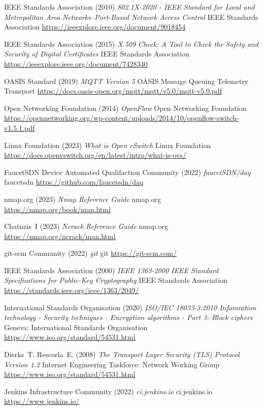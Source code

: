\documentclass[11pt, oneside]{book}   	%
\begin{document}
\begin{thebibliography}{99}
 IEEE Standards Association (2010)
\emph{802.1X-2020 - IEEE Standard for Local and Metropolitan Area Networks--Port-Based Network Access Control}
IEEE Standards Association
\url{https://ieeexplore.ieee.org/document/9018454}

 IEEE Standards Association (2015)
\emph{X.509 Check: A Tool to Check the Safety and Security of Digital Certificates}
IEEE Standards Association
\url{https://ieeexplore.ieee.org/document/7428340}

 OASIS Standard (2019)
\emph{MQTT Version 5}
OASIS Message Queuing Telemetry Transport 
\url{https://docs.oasis-open.org/mqtt/mqtt/v5.0/mqtt-v5.0.pdf}

 Open Networking Foundation (2014)
\emph{OpenFlow}
Open Networking Foundation
\url{https://opennetworking.org/wp-content/uploads/2014/10/openflow-switch-v1.5.1.pdf}

 Linux Foundation (2023)
\emph{What is Open vSwitch}
Linux Foundation 
\url{https://docs.openvswitch.org/en/latest/intro/what-is-ovs/}

 FaucetSDN Device Automated Qualifaction Community (2022)
\emph{faucetSDN/daq}
faucetsdn
\url{https://github.com/faucetsdn/daq}

 nmap.org (2023)
\emph{Nmap Reference Guide}
nmap.org
\url{https://nmap.org/book/man.html}

 Chatnzis~I (2023)
\emph{Ncrack Reference Guide}
nmap.org
\url{https://nmap.org/ncrack/man.html}

 git-scm Community (2022)
\emph{git}
git
\url{https://git-scm.com/}

 IEEE Standards Association (2000)
\emph{IEEE 1363-2000 IEEE Standard Specifications for Public-Key Cryptography}
IEEE Standards Association
\url{https://standards.ieee.org/ieee/1363/2049/}

 International Standards Organisation (2020)
\emph{ISO/IEC 18033-3:2010 Infomration technology - Security techniques - Encryption algorithms - Part 3: Block ciphers}
Geneva: International Standards Organisation
\url{https://www.iso.org/standard/54531.html}

 Dierks~T. Rescorla~E. (2008)
\emph{The Transport Layer Security (TLS) Protocol Version 1.2}
Internet Engineering Taskforce: Network Working Group
\url{https://www.iso.org/standard/54531.html}

 Jenkins Infrastructure Community (2022)
\emph{ci.jenkins.io}
ci.jenkins.io
\url{https://www.jenkins.io/}


\end{thebibliography}
\end{document}
